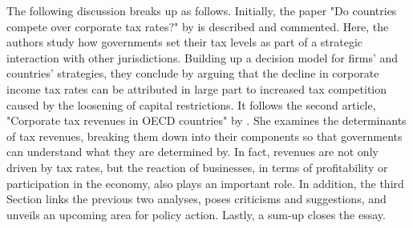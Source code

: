 The following discussion breaks up as follows. Initially, the paper  "Do countries compete over corporate tax rates?" by \textcite{dev-loc-red-08} is described and commented. Here, the authors study how governments set their tax levels as part of a strategic interaction with other jurisdictions. Building up a decision model for firms' and countries' strategies, they conclude by arguing that the decline in corporate income tax rates can be attributed in large part to increased tax competition caused by the loosening of capital restrictions. It follows the second article, "Corporate tax revenues in OECD countries" by \textcite{clausing}. She examines the determinants of tax revenues, breaking them down into their components so that governments can understand what they are determined by. In fact, revenues are not only driven by tax rates, but the reaction of businesses, in terms of profitability or participation in the economy, also plays an important role. In addition, the third Section links the previous two analyses, poses criticisms and suggestions, and unveils an upcoming area for policy action. Lastly, a sum-up closes the essay.